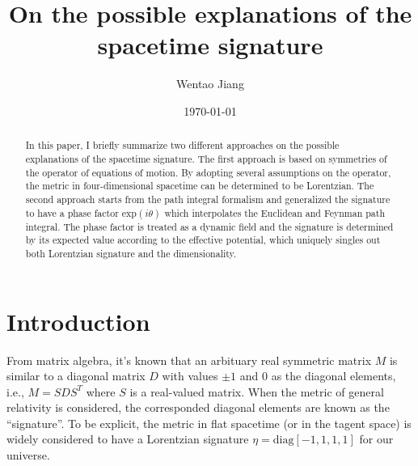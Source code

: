 \documentclass[%
 reprint,
groupedaddress,
showpacs,
 amsmath,amssymb,
 aps,
prb,
]{revtex4-1}
\begin{document}

\title{On the possible explanations of the spacetime signature}%

\author{Wentao Jiang}%


\date{\today}

\begin{abstract}
In this paper, I briefly summarize two different approaches on the possible explanations of the spacetime signature. The first approach is based on symmetries of the operator of equations of motion. By adopting several assumptions on the operator, the metric in four-dimensional spacetime can be determined to be Lorentzian. The second approach starts from the path integral formalism and generalized the signature to have a phase factor $ \mathrm{exp}(i \theta) $ which interpolates the Euclidean and Feynman path integral. The phase factor is treated as a dynamic field and the signature is determined by its expected value according to the effective potential, which uniquely singles out both Lorentzian signature and the dimensionality.
\end{abstract}
\maketitle


\section{Introduction} %
\label{sec:introduction}

From matrix algebra, it's known that an arbituary real symmetric matrix $M$ is similar to a diagonal matrix $D$ with values $\pm 1$ and $0$ as the diagonal elements, i.e., $ M = SDS^T $ where $S$ is a real-valued matrix. When the metric of general relativity is considered, the corresponded diagonal elements are known as the ``signature''. To be explicit, the metric in flat spacetime (or in the tagent space) is widely considered to have a Lorentzian signature $ \eta=\mathrm{diag}[-1,1,1,1] $ for our universe.
\end{document}
